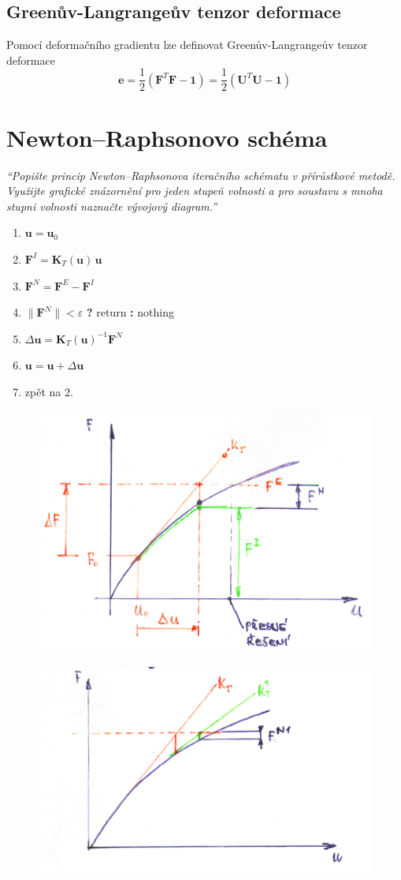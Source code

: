 \documentclass{article}
\begin{document}
	\subsection{Greenův-Langrangeův tenzor deformace}
	Pomocí deformačního gradientu lze definovat Greenův-Langrangeův tenzor deformace
	\begin{equation}
	\bm{e} = \frac{1}{2}(\bm{F}^T\bm{F} - \bm{1}) = \frac{1}{2}(\bm{U}^T\bm{U} - \bm{1})
	\end{equation}

	\section{Newton–Raphsonovo schéma}
	\emph{``Popište princip Newton–Raphsonova iteračního schématu v přírůstkové metodě. Využijte grafické znázornění pro jeden stupeň volnosti a pro soustavu s mnoha stupni volnosti naznačte vývojový diagram.''}
	\begin{enumerate}
		\item $\bm{u} = \bm{u}_0$
		\item $\bm{F}^I = \bm{K}_T(\bm{u})\,\bm{u}$
		\item $\bm{F}^N = \bm{F}^E - \bm{F}^I$
		\item $\|\bm{F}^N\| < \varepsilon$ \textbf{?} return \textbf{:} nothing
		\item $\Delta \bm{u} = \bm{K}_T(\bm{u})^{-1} \bm{F}^N$
		\item $\bm{u} = \bm{u} + \Delta \bm{u}$
		\item zpět na 2.
	\end{enumerate}
	\begin{figure}[h!]
		\centering
		\includegraphics[width=.5\linewidth]{figs/NR1.png}
	\end{figure}
	\begin{figure}[h!]
		\centering
		\includegraphics[width=.5\linewidth]{figs/NR2.png}
	\end{figure}
\end{document}
